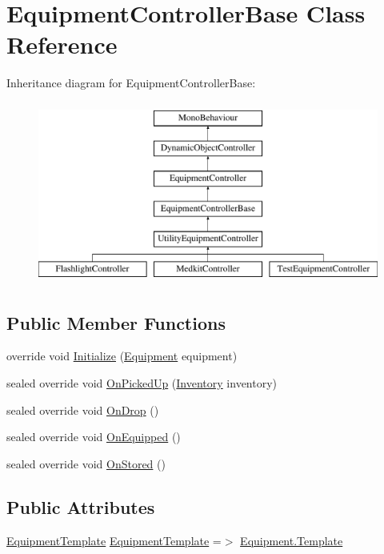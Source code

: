 \hypertarget{class_equipment_controller_base}{}\section{Equipment\+Controller\+Base Class Reference}
\label{class_equipment_controller_base}
Inheritance diagram for Equipment\+Controller\+Base\+:\begin{figure}[H]
\begin{center}
\leavevmode
\includegraphics[height=6.000000cm]{class_equipment_controller_base}
\end{center}
\end{figure}
\subsection*{Public Member Functions}
\begin{DoxyCompactItemize}
\item 
override void \mbox{\hyperlink{class_equipment_controller_base_a2bd9dfc6d920c98460436504145ebe6f}{Initialize}} (\mbox{\hyperlink{class_equipment}{Equipment}} equipment)
\item 
sealed override void \mbox{\hyperlink{class_equipment_controller_base_a357889ef978abc906de8d5b36b26d613}{On\+Picked\+Up}} (\mbox{\hyperlink{class_inventory}{Inventory}} inventory)
\item 
sealed override void \mbox{\hyperlink{class_equipment_controller_base_a8d45225cd0b3e6e07dec3eda588b7df1}{On\+Drop}} ()
\item 
sealed override void \mbox{\hyperlink{class_equipment_controller_base_a6518be3369d4118d4617c70c70fad38e}{On\+Equipped}} ()
\item 
sealed override void \mbox{\hyperlink{class_equipment_controller_base_aa98a3869354632bcc5dfe5e9103ccaed}{On\+Stored}} ()
\end{DoxyCompactItemize}
\subsection*{Public Attributes}
\begin{DoxyCompactItemize}
\item 
\mbox{\hyperlink{class_equipment_template}{Equipment\+Template}} \mbox{\hyperlink{class_equipment_controller_base_a343cc31c7be0c62538f9b1aadea60c46}{Equipment\+Template}} =$>$ \mbox{\hyperlink{class_equipment_a691c8de53afa564d0b1a0f1adb0978b7}{Equipment.\+Template}}
\end{DoxyCompactItemize}
